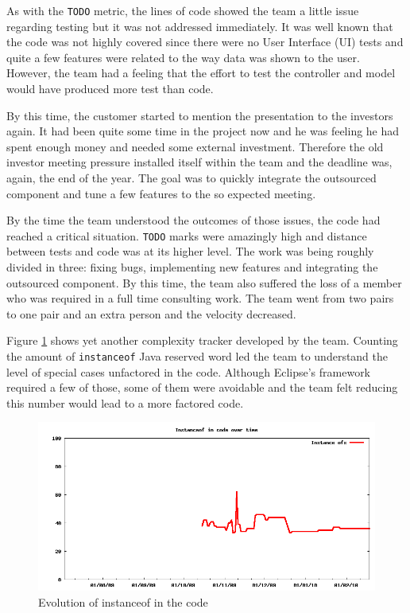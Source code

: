 \documentclass[lnbip]{svmultln}
\begin{document}
As with the \texttt{TODO} metric, the lines of code showed the team a
little issue regarding testing but it was not addressed
immediately. It was well known that the code was not highly covered
since there were no User Interface (UI) tests and quite a few features
were related to the way data was shown to the user. However, the team
had a feeling that the effort to test the controller and model would
have produced more test than code.

By this time, the customer started to mention the presentation
to the investors again. It had been quite some time in the project now and
he was feeling he had spent enough money and needed some external
investment. Therefore the old investor meeting pressure installed
itself within the team and the deadline was, again, the end of the
year. The goal was to quickly integrate the outsourced component and
tune a few features to the so expected meeting.

By the time the team understood the outcomes of those issues,
the code had reached a critical situation. \texttt{TODO} marks were
amazingly high and distance between tests and code was at its higher
level. The work was being roughly divided in three: fixing bugs,
implementing new features and integrating the outsourced component. By
this time, the team also suffered the loss of a member who was
required in a full time consulting work. The team went from two pairs
to one pair and an extra person and the velocity decreased.

Figure \ref{fig:InstanceOfs} shows yet another complexity tracker
developed by the team. Counting the amount of \texttt{instanceof} Java
reserved word led the team to understand the level of special cases
unfactored in the code. Although Eclipse's framework required a few of
those, some of them were avoidable and the team felt reducing this
number would lead to a more factored code.

\begin{figure}[hbt]
  \centerline{
    \includegraphics[width=120mm]{InstanceOfs.png}
  }
  \caption{Evolution of instanceof in the code }
  \label{fig:InstanceOfs}
\end{figure}
\end{document}

